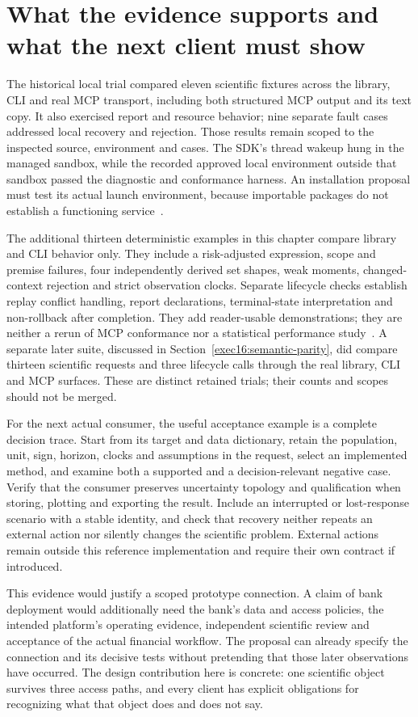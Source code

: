 \section{What the evidence supports and what the next client must show}

The historical local trial compared eleven scientific fixtures across the
library, CLI and real MCP transport, including both structured MCP output
and its text copy. It also exercised report and resource behavior; nine
separate fault cases addressed local recovery and rejection. Those results
remain scoped to the inspected source, environment and cases. The SDK's
thread wakeup hung in the managed sandbox, while the recorded approved local
environment outside that sandbox passed the diagnostic and conformance
harness. An installation proposal must test its actual launch environment,
because importable packages do not establish a functioning service~\citep{v12_in_runtime}.

The additional thirteen deterministic examples in this chapter compare
library and CLI behavior only. They include a risk-adjusted expression,
scope and premise failures, four independently derived set shapes, weak
moments, changed-context rejection and strict observation clocks. Separate
lifecycle checks establish replay conflict handling, report declarations,
terminal-state interpretation and non-rollback after completion. They add
reader-usable demonstrations; they are neither a rerun of MCP conformance
nor a statistical performance study~\citep{exec13_i2_examples}. A separate later suite, discussed in Section~\ref{exec16:semantic-parity}, did compare thirteen scientific requests and three lifecycle calls through the real library, CLI and MCP surfaces. These are distinct retained trials; their counts and scopes should not be merged.

For the next actual consumer, the useful acceptance example is a complete
decision trace. Start from its target and data dictionary, retain the
population, unit, sign, horizon, clocks and assumptions in the request,
select an implemented method, and examine both a supported and a
decision-relevant negative case. Verify that the consumer preserves
uncertainty topology and qualification when storing, plotting and exporting
the result. Include an interrupted or lost-response scenario with a stable
identity, and check that recovery neither repeats an external action nor
silently changes the scientific problem. External actions remain outside
this reference implementation and require their own contract if introduced.

This evidence would justify a scoped prototype connection. A claim of bank
deployment would additionally need the bank's data and access policies,
the intended platform's operating evidence, independent scientific review
and acceptance of the actual financial workflow. The proposal can already
specify the connection and its decisive tests without pretending that those
later observations have occurred. The design contribution here is concrete:
one scientific object survives three access paths, and every client has
explicit obligations for recognizing what that object does and does not say.
\label{exec13:i2-end}
